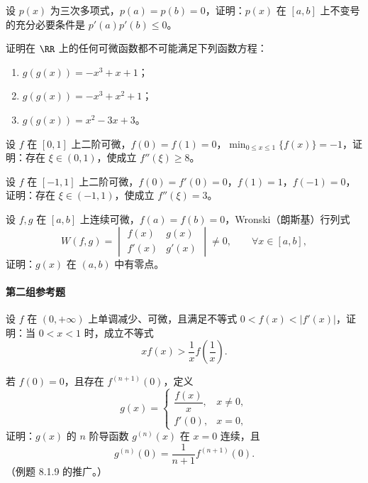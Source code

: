 \begin{xreferenceproblem}[14]
设 $p(x)$ 为三次多项式，$p(a)=p(b)=0$，证明：$p(x)$ 在 $[a,b]$ 上不变号的充分必要条件是 $p'(a)p'(b)\le0$。
\end{xreferenceproblem}

\begin{xreferenceproblem}[15]
证明在 $\RR$ 上的任何可微函数都不可能满足下列函数方程：
  \begin{enumerate}[label=(\arabic*)]
    \item $g(g(x))=-x^3+x+1$；
    \item $g(g(x))=-x^3+x^2+1$；
    \item $g(g(x))=x^2-3x+3$。
  \end{enumerate}
\end{xreferenceproblem}

\begin{xreferenceproblem}[16]
设 $f$ 在 $[0,1]$ 上二阶可微，$f(0)=f(1)=0$，$\displaystyle\min_{0\le x\le1}\{f(x)\}=-1$，证明：存在 $\xi\in(0,1)$，使成立 $f''(\xi)\ge8$。
\end{xreferenceproblem}

\begin{xreferenceproblem}[17]
设 $f$ 在 $[-1,1]$ 上二阶可微，$f(0)=f'(0)=0$，$f(1)=1$，$f(-1)=0$，证明：存在 $\xi\in(-1,1)$，使成立 $f''(\xi)=3$。
\end{xreferenceproblem}

\begin{xreferenceproblem}[18]
设 $f,g$ 在 $[a,b]$ 上连续可微，$f(a)=f(b)=0$，Wronski（朗斯基）行列式
  \[
    W(f,g)=
    \begin{vmatrix}
      f(x)&g(x)\\
      f'(x)&g'(x)
    \end{vmatrix}
    \ne0,\qquad\forall x\in[a,b],
  \]
  证明：$g(x)$ 在 $(a,b)$ 中有零点。
\end{xreferenceproblem}

\paragraph{第二组参考题}

\begin{xreferenceproblem}[1]
设 $f$ 在 $(0,+\infty)$ 上单调减少、可微，且满足不等式 $0<f(x)<|f'(x)|$，证明：当 $0<x<1$ 时，成立不等式
  \[
    xf(x)>\frac1x f\left(\frac1x\right).
  \]
\end{xreferenceproblem}

\begin{xreferenceproblem}[2]
若 $f(0)=0$，且存在 $f^{(n+1)}(0)$，定义
  \[
    g(x)=
    \begin{cases}
      \dfrac{f(x)}x,&x\ne0,\\
      f'(0),&x=0,
    \end{cases}
  \]
  证明：$g(x)$ 的 $n$ 阶导函数 $g^{(n)}(x)$ 在 $x=0$ 连续，且
  \[
    g^{(n)}(0)=\frac1{n+1}f^{(n+1)}(0).
  \]
  （例题 8.1.9 的推广。）
\end{xreferenceproblem}

